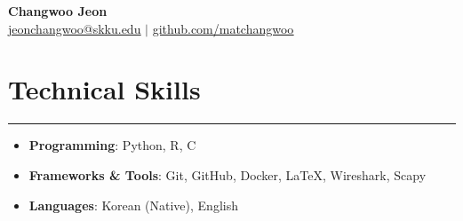 \documentclass[letterpaper, 10pt]{article}
\begin{document}
\begin{center}
    \textbf{\LARGE Changwoo Jeon} \\ \vspace{2pt}
    \href{mailto:jeonchangwoo@skku.edu}{\underline{jeonchangwoo@skku.edu}} $|$
    \href{https://github.com/matchangwoo}{\underline{github.com/matchangwoo}}
\end{center}

\section*{Technical Skills}
\hrule
\vspace{4pt}
\begin{itemize}
  \item[] \textbf{Programming}: Python, R, C
  \item[] \textbf{Frameworks \& Tools}: Git, GitHub, Docker, LaTeX, Wireshark, Scapy
  \item[] \textbf{Languages}: Korean (Native), English
\end{itemize}

\end{document}
